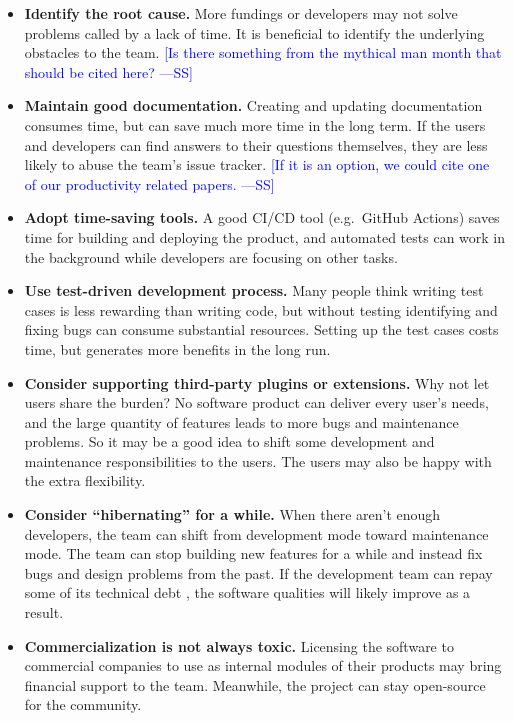 \documentclass[final, 3p, times, authoryear]{elsarticle}
\newcommand{\authornote}[3]{\textcolor{#1}{[#3 ---#2]}}
\newcommand{\authornote}[3]{}
\newcommand{\wss}[1]{\authornote{blue}{SS}{#1}} %
\begin{document}
\begin{itemize}
\item \textbf{Identify the root cause.} More fundings or developers may not
solve problems called by a lack of time. It is beneficial to identify the
underlying obstacles to the team.  \wss{Is there something from the mythical man
month that should be cited here?}

\item \textbf{Maintain good documentation.} Creating and updating documentation
consumes time, but can save much more time in the long term. If the users and
developers can find answers to their questions themselves, they are less likely
to abuse the team's issue tracker.  \wss{If it is an option, we could cite one
of our productivity related papers.}

\item \textbf{Adopt time-saving tools.} A good CI/CD tool (e.g.\ GitHub Actions)
saves time for building and deploying the product, and automated tests can work
in the background while developers are focusing on other tasks.

\item \textbf{Use test-driven development process.} Many people think writing
test cases is less rewarding than writing code, but without testing identifying
and fixing bugs can consume substantial resources. Setting up the test cases
costs time, but generates more benefits in the long run.

\item \textbf{Consider supporting third-party plugins or extensions.} Why not
let users share the burden? No software product can deliver every user's needs,
and the large quantity of features leads to more bugs and maintenance problems.
So it may be a good idea to shift some development and maintenance
responsibilities to the users. The users may also be happy with the extra
flexibility.

\item \textbf{Consider ``hibernating'' for a while.} When there aren't enough
developers, the team can shift from development mode toward maintenance mode.
The team can stop building new features for a while and instead fix bugs and
design problems from the past. If the development team can repay some of its
technical debt \citep{KruchtenEtAl2012}, the software qualities will likely
improve as a result.

\item \textbf{Commercialization is not always toxic.} Licensing the software to
commercial companies to use as internal modules of their products may bring
financial support to the team. Meanwhile, the project can stay open-source for
the community.
\end{itemize}
\end{document}
